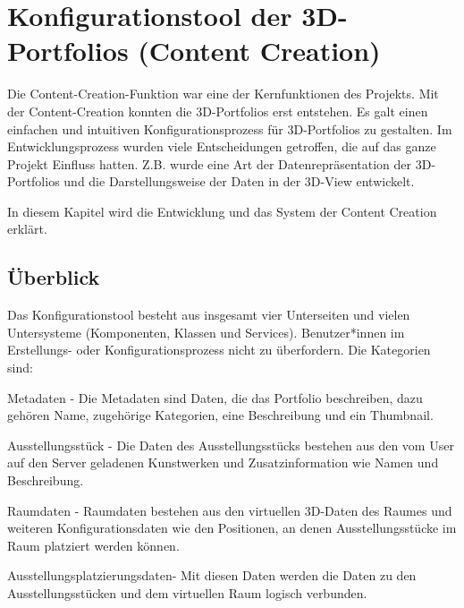 \section{Konfigurationstool der 3D-Portfolios (Content Creation)} \label{Konfigurationstool}

Die Content-Creation-Funktion war eine der Kernfunktionen des Projekts. Mit der Content-Creation konnten die 3D-Portfolios erst entstehen. Es galt einen einfachen und intuitiven Konfigurationsprozess für 3D-Portfolios zu gestalten. Im Entwicklungsprozess wurden viele Entscheidungen getroffen, die auf das ganze Projekt Einfluss hatten. Z.B. wurde eine Art der Datenrepräsentation der 3D-Portfolios und die Darstellungsweise der Daten in der 3D-View entwickelt.

In diesem Kapitel wird die Entwicklung und das System der Content Creation erklärt.

\subsection{Überblick}
Das Konfigurationstool besteht aus insgesamt vier Unterseiten und vielen Untersysteme (Komponenten, Klassen und Services). Benutzer*innen im Erstellungs- oder Konfigurationsprozess nicht zu überfordern. Die Kategorien sind:
\begin{compactitem}
\item Metadaten - Die Metadaten sind Daten, die das Portfolio beschreiben, dazu gehören Name, zugehörige Kategorien, eine Beschreibung und ein Thumbnail.
\item Ausstellungsstück - Die Daten des Ausstellungsstücks bestehen aus den vom User auf den Server geladenen Kunstwerken und Zusatzinformation wie Namen und Beschreibung.
\item Raumdaten - Raumdaten bestehen aus den virtuellen 3D-Daten des Raumes und weiteren Konfigurationsdaten wie den Positionen, an denen Ausstellungsstücke im Raum platziert werden können.
\item Ausstellungsplatzierungsdaten- Mit diesen Daten werden die Daten zu den Ausstellungsstücken und dem virtuellen Raum logisch verbunden. 
\end{compactitem}
